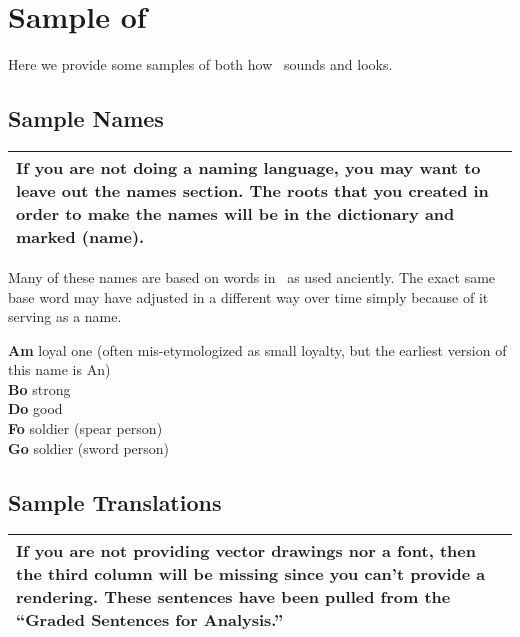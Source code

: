 
\chapter{Sample of \LanguageName}

Here we provide some samples of both how \LanguageName\ sounds and looks.

\section{Sample Names}

\begin{center}
\begin{tabular}{|p{}|}\hline
If you are not doing a naming language, you may want to leave out the names section.
The roots that you created in order to make the names will be in the dictionary and marked (name).
\\\hline
\end{tabular}
\end{center}

Many of these names are based on words in \LanguageName\ as used anciently.
The exact same base word may have adjusted in a different way over time simply because of it serving as a name.

\begin{multicols}{2}
\noindent
\textbf{Am} loyal one (often mis-etymologized as small loyalty, but the earliest version of this name is An)\\
\textbf{Bo} strong\\
\textbf{Do} good\\
\textbf{Fo} soldier (spear person)\\
\textbf{Go} soldier (sword person)
\end{multicols}

\section{Sample Translations}

\begin{center}
\begin{tabular}{|p{}|}\hline
If you are not providing vector drawings nor a font, then the third column will be missing since you can't provide a rendering.
These sentences have been pulled from the ``Graded Sentences for Analysis.''\\\hline
\end{tabular}
\end{center}

